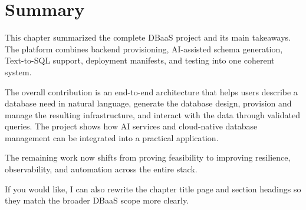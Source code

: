 \section{Summary}
\label{sec:7.4_summary}

This chapter summarized the complete DBaaS project and its main takeaways. The platform combines backend provisioning, AI-assisted schema generation, Text-to-SQL support, deployment manifests, and testing into one coherent system.

The overall contribution is an end-to-end architecture that helps users describe a database need in natural language, generate the database design, provision and manage the resulting infrastructure, and interact with the data through validated queries. The project shows how AI services and cloud-native database management can be integrated into a practical application.

The remaining work now shifts from proving feasibility to improving resilience, observability, and automation across the entire stack.

If you would like, I can also rewrite the chapter title page and section headings so they match the broader DBaaS scope more clearly.
